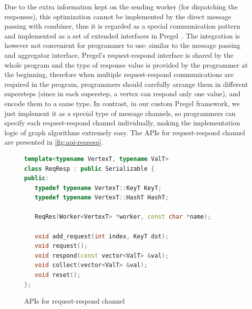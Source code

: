 \documentclass{sokendai_thesis} %
\newcommand{\plus}{\raisebox{.25ex}{\scalebox{.8}{+}}}
\begin{document}
Due to the extra information kept on the sending worker (for dispatching the responses), this optimization cannot be implemented by the direct message passing with combiner, thus it is regarded as a special communication pattern and implemented as a set of extended interfaces in Pregel\plus~\cite{pregelplus}.
The integration is however not convenient for programmer to use:
similar to the message passing and aggregator interface, Pregel\plus's request-respond interface is shared by the whole program and the type of response value is provided by the programmer at the beginning, therefore when multiple request-respond communications are required in the program, programmers should carefully arrange them in different supersteps (since in each superstep, a vertex can respond only one value), and encode them to a same type.
In contrast, in our custom Pregel framework, we just implement it as a special type of message channels, so programmers can specify each request-respond channel individually, making the implementation logic of graph algorithms extremely easy.
The APIs for request-respond channel are presented in \autoref{fig:api-reqresp}.

\begin{figure}[ht]
\centering
\vspace{-2ex}
\begin{lstlisting}[basicstyle=\small\ttfamily,numbers=none,language=c++]
template<typename VertexT, typename ValT>
class ReqResp : public Serializable {
public:
   typedef typename VertexT::KeyT KeyT;
   typedef typename VertexT::HashT HashT;

   ReqRes(Worker<VertexT> *worker, const char *name);

   void add_request(int index, KeyT dst);
   void request();
   void respond(const vector<ValT> &val);
   void collect(vector<ValT> &val);
   void reset();
};
\end{lstlisting}
\vspace{-2ex}
\caption{APIs for request-respond channel}
\label{fig:api-reqresp}
\end{figure}
\end{document}

